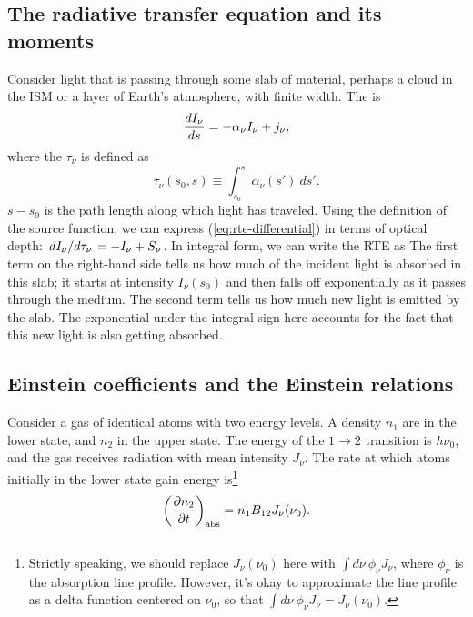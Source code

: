 \subsection{The radiative transfer equation and its moments}
Consider light that is passing through some slab of material, perhaps a cloud in the ISM or a layer of Earth's atmosphere, with finite width. The  is
\begin{align} \label{eq:rte-differential}
    \dv{I_\nu}{s} = -\alpha_\nu I_\nu + j_\nu,
\end{align}
where the  $\tau_\nu$ is defined as
\begin{equation} \label{eq:optical-depth}
    \tau_\nu(s_0, s) \equiv \int_{s_0}^s \alpha_\nu(s') \: ds'.
\end{equation}
$s - s_0$ is the path length along which light has traveled. Using the definition of the source function, we can express (\ref{eq:rte-differential}) in terms of optical depth: $\dv*{I_\nu}{\tau_\nu} = -I_\nu + S_\nu$. In integral form, we can write the RTE as
The first term on the right-hand side tells us how much of the incident light is absorbed in this slab; it starts at intensity $I_\nu(s_0)$ and then falls off exponentially as it passes through the medium. The second term tells us how much new light is emitted by the slab. The exponential under the integral sign here accounts for the fact that this new light is also getting absorbed.

\subsection{Einstein coefficients and the Einstein relations}
Consider a gas of identical atoms with two energy levels. A density $n_1$ are in the lower state, and $n_2$ in the upper state. The energy of the $1 \to 2$ transition is $h\nu_0$, and the gas receives radiation with mean intensity $J_\nu$. The rate at which atoms initially in the lower state gain energy is\footnote{Strictly speaking, we should replace $J_\nu(\nu_0)$ here with $\int d\nu \: \phi_\nu J_\nu$, where $\phi_\nu$ is the absorption line profile. However, it's okay to approximate the line profile as a delta function centered on $\nu_0$, so that $\int d\nu \: \phi_\nu J_\nu = J_\nu(\nu_0)$.}
\begin{align} \label{eq:B12}
    \left ( \pdv{n_2}{t} \right )_\text{abs} = n_1 B_{12} J_\nu(\nu_0).
\end{align}

